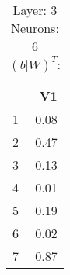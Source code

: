 \begin{table}[ht]
\centering
\begin{tabular}{rr}
  \hline
 & V1 \\ 
  \hline
1 & 0.08 \\ 
  2 & 0.47 \\ 
  3 & -0.13 \\ 
  4 & 0.01 \\ 
  5 & 0.19 \\ 
  6 & 0.02 \\ 
  7 & 0.87 \\ 
   \hline
\end{tabular}
\caption{Layer: 3 Neurons: 6  $(b|W)^T$: 
} 
\end{table}
